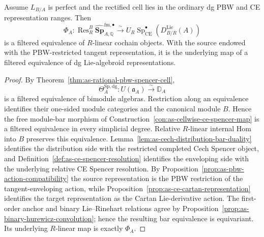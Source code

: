 \begin{theorem}
\label{thm:as-cellwise-ce-reconstruction}
Assume $L_{B/A}$ is perfect and the rectified cell lies in the ordinary dg
PBW and CE representation ranges.  Then
\[
\boxed{
    \Phi_A:
    \operatorname{Res}_R^B
    \widehat{\mathbf{Sp}}_{A,\mathbb Q}^{\mathrm{fm},\bullet}
    \xrightarrow{\sim}
    U_R
    \operatorname{Sp}_{\mathrm{CE}}^{\bullet}
    \left(
        D_{B/R}^{\mathrm{Lie}}(A)
    \right)
}
\]
is a filtered equivalence of $R$-linear cochain objects.  With the source
endowed with the PBW-restricted tangent representation, it is the underlying
map of a filtered equivalence of dg Lie-algebroid representations.
\end{theorem}

\begin{proof}
By Theorem~\ref{thm:as-rational-pbw-spencer-cell},
\[
    \Theta_A^{\mathrm{Sp,dg}}:
    U(\mathfrak a_A)
    \xrightarrow{\sim}
    \mathbb D_A
\]
is a filtered equivalence of bimodule algebras.  Restriction along an
equivalence identifies their one-sided module categories and the canonical
module $B$.  Hence the free module-bar morphism of
Construction~\ref{con:as-cellwise-ce-spencer-map} is a filtered equivalence
in every simplicial degree.  Relative $R$-linear internal Hom into $B$ preserves this equivalence.
Lemma~\ref{lem:as-cech-distribution-bar-duality} identifies the distribution
side with the restricted completed Cech Spencer object, and
Definition~\ref{def:as-ce-spencer-resolution} identifies the enveloping side
with the underlying relative CE Spencer resolution.  By
Proposition~\ref{prop:as-pbw-action-compatibility} the source representation
is the PBW restriction of the tangent-enveloping action, while
Proposition~\ref{prop:as-ce-cartan-representation} identifies the target
representation as the Cartan Lie-derivative action.  The first-order anchor
and binary Lie--Rinehart relations agree by
Proposition~\ref{prop:as-binary-hurewicz-convolution}; hence the resulting
bar equivalence is equivariant.  Its underlying $R$-linear map is exactly
$\Phi_A$.
\end{proof}

